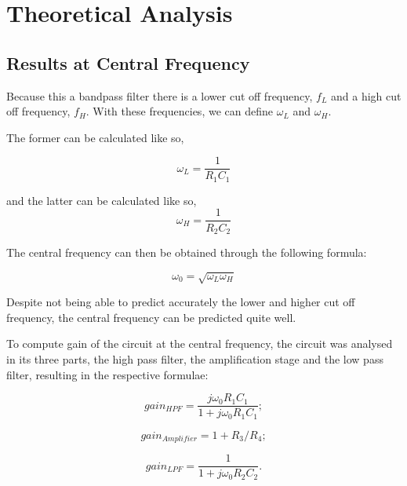\section{Theoretical Analysis}
\label{sec:theoretical analysis}

\subsection{Results at Central Frequency}

\indent

Because this a bandpass filter there is a lower cut off frequency, $f_L$ and a high cut off frequency, $f_H$. With these frequencies, we can define $\omega_L$ and $\omega_H$.

The former can be calculated like so,


\[\omega_L = \frac{1}{R_1 C_1}\tag{1}\label{1}\]

and the latter can be calculated like so, \[\omega_H = \frac{1}{R_2 C_2}\tag{2}\label{2}\]

The central frequency can then be obtained through the following formula: 

\[\omega _0 =\sqrt{\omega _L \omega _H}\tag{3}\label{3}\]

\vspace{0.5cm}
\begin{center}
\end{center}

Despite not being able to predict accurately the lower and higher cut off frequency, the central frequency can be predicted quite well. 

\vspace{1cm}

To compute gain of the circuit at the central frequency, the circuit was analysed in its three parts,  the high pass filter, the amplification stage and the low pass filter, resulting in the respective formulae:

\vspace{0.5cm}

\[gain_{HPF}=\frac{j\omega _0 R_1 C_1}{1+j \omega _0 R_1 C_1};\tag{4}\label{4}\]
 
\[gain_{Amplifier}=1+R_3/R_4;\tag{5}\label{5}\]
 
\[gain_{LPF} = \frac{1}{1+j \omega _0 R_2 C_2}.\tag{6}\label{6}\]
 
\vspace{1cm}
 
